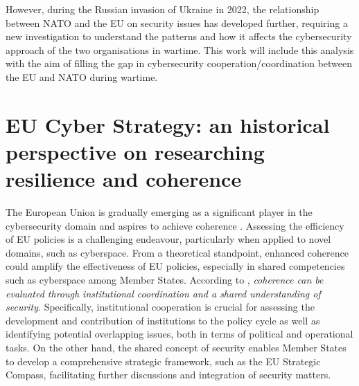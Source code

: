 However, during the Russian invasion of Ukraine in 2022, the relationship between NATO and the EU on security issues has developed further, requiring a new investigation to understand the patterns and how it affects the cybersecurity approach of the two organisations in wartime. This work will include this analysis with the aim of filling the gap in cybersecurity cooperation/coordination between the EU and NATO during wartime.

\section{EU Cyber Strategy: an historical perspective on researching resilience and coherence}

The European Union is gradually emerging as a significant player in the cybersecurity domain and aspires to achieve coherence \autocite{carrapico_2017_the}. Assessing the efficiency of EU policies is a challenging endeavour, particularly when applied to novel domains, such as cyberspace. From a theoretical standpoint, enhanced coherence could amplify the effectiveness of EU policies, especially in shared competencies such as cyberspace among Member States. According to \textcite[1256]{carrapico_2017_the}, \textit{coherence can be evaluated through institutional coordination and a shared understanding of security}. Specifically, institutional cooperation is crucial for assessing the development and contribution of institutions to the policy cycle as well as identifying potential overlapping issues, both in terms of political and operational tasks. On the other hand, the shared concept of security enables Member States to develop a comprehensive strategic framework, such as the EU Strategic Compass, facilitating further discussions and integration of security matters.

